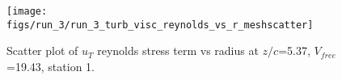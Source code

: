 \begin{figure}[H]
\centering
\texttt{[image: figs/run\_3/run\_3\_turb\_visc\_reynolds\_vs\_r\_meshscatter]}
\caption{Scatter plot of $
u_T$ reynolds stress term vs radius at $z/c$=5.37, $V_{free}$=19.43, station 1.}
\label{fig:run_3_turb_visc_reynolds_vs_r_meshscatter}
\end{figure}



